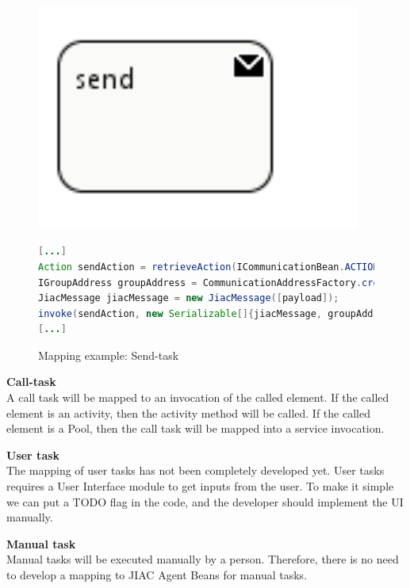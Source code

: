 \begin{figure}[h]
\begin{minipage}[c]{0.3\textwidth}
\includegraphics[width=0.95\textwidth]{images/mapping/sendTask.png}
\end{minipage}
\begin{minipage}[c]{0.7\textwidth}
\begin{lstlisting}[language=Java]
[...]
Action sendAction = retrieveAction(ICommunicationBean.ACTION_SEND);
IGroupAddress groupAddress = CommunicationAddressFactory.createGroupAddress([address]);
JiacMessage jiacMessage = new JiacMessage([payload]);
invoke(sendAction, new Serializable[]{jiacMessage, groupAddress});
[...]
\end{lstlisting}
\end{minipage}
\caption{Mapping example: Send-task}%
\label{fig:send_task}%
\end{figure}


\textbf{Call-task}\\
A call task will be mapped to an invocation of the called element. If the called element is an activity, then the activity method will be called. 
If the called element is a Pool, then the call task will be mapped into a service invocation. 

\textbf{User task}\\
The mapping of user tasks has not been completely developed yet. User tasks requires a User Interface module to get inputs from the user. To make it simple we can put a TODO flag in the code, and the developer should implement the UI manually. 

\textbf{Manual task}\\
Manual tasks will be executed manually by a person. Therefore, there is no need to develop a mapping to JIAC Agent Beans for manual tasks.

